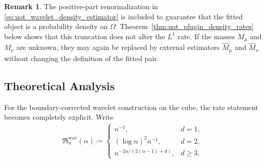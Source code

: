 \documentclass[11pt,reqno]{amsart}
\theoremstyle{definition}
\newtheorem{remark}{Remark}
\renewcommand{\hat}{\widehat}
\begin{document}
\begin{remark}
The positive-part renormalization in \eqref{eq:uot_wavelet_density_estimator} is included to guarantee that the fitted object is a probability density on $\Omega$. Theorem~\ref{thm:uot_plugin_density_rates} below shows that this truncation does not alter the $L^1$ rate. If the masses $M_\mu$ and $M_\nu$ are unknown, they may again be replaced by external estimators $\hat M_\mu$ and $\hat M_\nu$ without changing the definition of the fitted pair.
\end{remark}



\subsection{Theoretical Analysis}



For the boundary-corrected wavelet construction on the cube, the rate statement becomes completely explicit. Write
\begin{align}
    \mathfrak R_n^{\mathrm{wav}}(\alpha)
    \coloneqq
    \begin{cases}
        n^{-1}, & d=1,\\
        (\log n)^2 n^{-1}, & d=2,\\
        n^{{-2\alpha/(2(\alpha-1)+d)}}, & d\ge 3.
    \end{cases}
\end{align}
\end{document}
